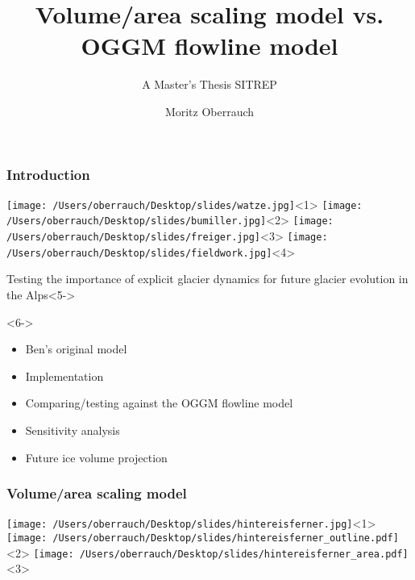 \documentclass[12pt, aspectratio=169, abstract=off, oneside]{beamer}
\begin{document}
	\title{Volume/area scaling model vs.\\OGGM flowline model}
    \subtitle{A Master's Thesis SITREP}
    \author{Moritz Oberrauch}

    \frame{\titlepage}

    \begin{frame}[t]\frametitle{Introduction}
        \centering
        \texttt{[image: /Users/oberrauch/Desktop/slides/watze.jpg]}<1>
        \texttt{[image: /Users/oberrauch/Desktop/slides/bumiller.jpg]}<2>
        \texttt{[image: /Users/oberrauch/Desktop/slides/freiger.jpg]}<3>
        \texttt{[image: /Users/oberrauch/Desktop/slides/fieldwork.jpg]}<4>

        \begin{block}{Testing the importance of explicit glacier dynamics for future glacier evolution in the Alps}<5->
        \end{block}
        \begin{block}{\color[HTML]{f69d0e}{How much better is the OGGM really?!}}<6->
            
        \end{block}

        \begin{itemize}
            \item<7-> Ben's original model \citep{Marzeion2012b}
            \item<8-> Implementation
            \item<9-> Comparing/testing against the OGGM flowline model
            \item<10-> Sensitivity analysis
            \item<11-> Future ice volume projection
        \end{itemize}
        
    
    \end{frame}

    \begin{frame}[t]\frametitle{Volume/area scaling model}

        \centering
        \texttt{[image: /Users/oberrauch/Desktop/slides/hintereisferner.jpg]}<1>
        \texttt{[image: /Users/oberrauch/Desktop/slides/hintereisferner\_outline.pdf]}<2>
        \texttt{[image: /Users/oberrauch/Desktop/slides/hintereisferner\_area.pdf]}<3>
    
    \end{frame}
\end{document}
